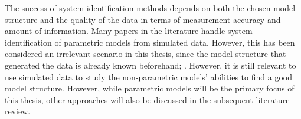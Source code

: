 The success of system identification methods depends on both the chosen model structure and the quality of the data in terms of measurement accuracy and amount of information. Many papers in the literature handle system identification of parametric models from simulated data. However, this has been considered an irrelevant scenario in this thesis, since the model structure that generated the data is already known beforehand;  \cite{millerShipModelIdentification2021}. However, it is still relevant to use simulated data to study the non-parametric models' abilities to find a good model structure. However, while parametric models will be the primary focus of this thesis, other approaches will also be discussed in the subsequent literature review.

